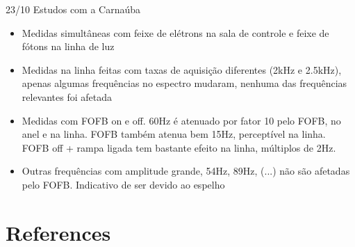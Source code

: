 \documentclass{beamer}					  %
\begin{document}
\begin{frame}{23/10 Estudos com a Carnaúba}
    \begin{itemize}
        \item Medidas simultâneas com feixe de elétrons na sala de controle e feixe de fótons na linha de luz
        \item Medidas na linha feitas com taxas de aquisição diferentes (2kHz e 2.5kHz), apenas algumas frequências no espectro mudaram, nenhuma das frequências relevantes foi afetada
        \item Medidas com FOFB on e off. 60Hz é atenuado por fator 10 pelo FOFB, no anel e na linha. FOFB também atenua bem 15Hz, perceptível na linha. FOFB off + rampa ligada tem bastante efeito na linha, múltiplos de 2Hz.
        \item Outras frequências com amplitude grande, 54Hz, 89Hz, (...) não são afetadas pelo FOFB. Indicativo de ser devido ao espelho
	\end{itemize}
\end{frame}

\section{References}
\end{document}
